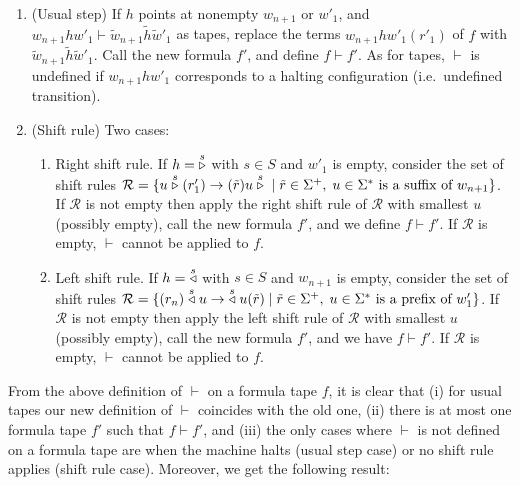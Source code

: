 \begin{enumerate}
    \item (Usual step) If $h$ points at nonempty $w_{n+1}$ or $w'_1$, and $w_{n+1} h w'_1 \vdash \tilde{w}_{n+1} \tilde{h} \tilde{w}'_1$ as tapes, replace the terms $w_{n+1} h w'_1(r'_1)$ of $f$ with $\tilde{w}_{n+1} \tilde{h} \tilde{w}'_1$. Call the new formula $f'$, and define $f \vdash f'$.
          As for tapes, $\vdash$ is undefined if $w_{n+1} h w'_1$ corresponds to a halting configuration (i.e.\ undefined transition).
    \item (Shift rule) Two cases:
          \begin{enumerate}

              \item Right shift rule. If $h=\;\stackrel{s}\triangleright$ with $s\in S$ and $w'_1$ is empty, consider the set of shift rules $\mathcal{R} = \{ u \stackrel{s}\triangleright(r'_1) \to (\tilde{r})u\stackrel{s}\triangleright \; | \; \tilde{r}\in\Sigma^+,\; u\in\Sigma^* \text{ is a suffix of } w_{n+1}\}$. If $\mathcal{R}$ is not empty then apply the right shift rule of $\mathcal{R}$ with smallest $u$ (possibly empty), call the new formula $f'$, and we define $f \vdash f'$. If $\mathcal{R}$ is empty, $\vdash$ cannot be applied to $f$.
              \item Left shift rule. If $h=\;\stackrel{s}\triangleleft$ with $s\in S$ and $w_{n+1}$ is empty, consider the set of shift rules $\mathcal{R} = \{ (r_{n})\stackrel{s}\triangleleft u \to \;\stackrel{s}\triangleleft u(\tilde{r}) \; | \; \tilde{r}\in\Sigma^+,\; u\in\Sigma^* \text{ is a prefix of } w'_{1}\}$. If $\mathcal{R}$ is not empty then apply the left shift rule of $\mathcal{R}$ with smallest $u$ (possibly empty), call the new formula $f'$, and we have $f \vdash f'$. If $\mathcal{R}$ is empty, $\vdash$ cannot be applied to $f$.

          \end{enumerate}

\end{enumerate}

From the above definition of $\vdash$ on a formula tape $f$, it is clear that (i) for usual tapes our new definition of $\vdash$ coincides with the old one, (ii) there is at most one formula tape $f'$ such that $f \vdash f'$, and (iii) the only cases where $\vdash$ is not defined on a formula tape are when the machine halts (usual step case) or no shift rule applies (shift rule case). Moreover, we get the following result:

